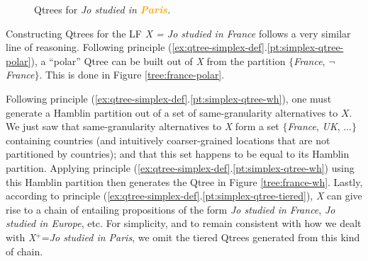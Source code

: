 	\begin{figure}[H]
		\centering
		\begin{subfigure}[b]{.3\linewidth}
			\centering
		\caption{}\label{tree:paris-polar}
		\end{subfigure}
		\hfill
		\begin{subfigure}[b]{.3\linewidth}
			\centering
			\caption{}\label{tree:paris-wh}
		\end{subfigure}\hfill
		\begin{subfigure}[b]{.3\linewidth}
			\centering
			\caption{}\label{tree:paris-tiered}
		\end{subfigure}
		
		
		\caption{Qtrees for \textit{Jo studied in \textbf{\textcolor{orange}{Paris}}.}}\label{fig:city-partition}
	\end{figure}
	
	Constructing Qtrees for the LF \textit{X = Jo studied in France} follows a very similar line of reasoning. Following principle (\ref{ex:qtree-simplex-def}.\ref{pt:simplex-qtree-polar}), a ``polar'' Qtree can be built out of \textit{X} from the partition $\lbrace$\textit{France}, $\neg$\textit{France}$\rbrace$. This is done in Figure \ref{tree:france-polar}.
	
	
	
	Following principle (\ref{ex:qtree-simplex-def}.\ref{pt:simplex-qtree-wh}), one must generate a Hamblin partition out of a set of same-granularity alternatives to $X$. We just saw that same-granularity alternatives to \textit{X} form a set $\lbrace$\textit{France}, \textit{UK}, ...$\rbrace$ containing countries (and intuitively coarser-grained locations that are not partitioned by countries); and that this set happens to be equal to its Hamblin partition. Applying principle (\ref{ex:qtree-simplex-def}.\ref{pt:simplex-qtree-wh}) using this Hamblin partition then generates the Qtree in Figure \ref{tree:france-wh}. Lastly, according to principle (\ref{ex:qtree-simplex-def}.\ref{pt:simplex-qtree-tiered}), \textit{X} can give rise to a chain of entailing propositions of the form \textit{Jo studied in France}, \textit{Jo studied in Europe}, etc. For simplicity, and to remain consistent with how we dealt with \textit{X}$^+$=\textit{Jo studied in Paris}, we omit the tiered Qtrees generated from this kind of chain.
	
